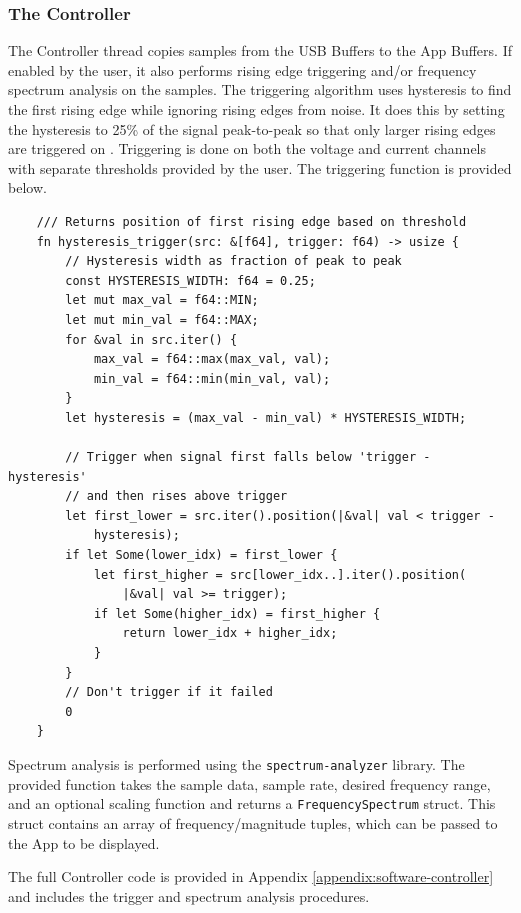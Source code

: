 \documentclass[letterpaper,11pt]{article}
\newcommand{\code}[1]{\texttt{#1}}
\begin{document}
\subsubsection{The Controller} \label{sec:soft-controller}
The Controller thread copies samples from the USB Buffers to the App Buffers.
If enabled by the user, it also performs rising edge triggering and/or frequency
spectrum analysis on the samples. The triggering algorithm uses hysteresis to
find the first rising edge while ignoring rising edges from noise. It does this
by setting the hysteresis to 25\% of the signal peak-to-peak so that only larger
rising edges are triggered on \cite{hysteresis}. Triggering is done on both the
voltage and current channels with separate thresholds provided by the user.
The triggering function is provided below.

\begin{verbatim}
    /// Returns position of first rising edge based on threshold
    fn hysteresis_trigger(src: &[f64], trigger: f64) -> usize {
        // Hysteresis width as fraction of peak to peak
        const HYSTERESIS_WIDTH: f64 = 0.25;
        let mut max_val = f64::MIN;
        let mut min_val = f64::MAX;
        for &val in src.iter() {
            max_val = f64::max(max_val, val);
            min_val = f64::min(min_val, val);
        }
        let hysteresis = (max_val - min_val) * HYSTERESIS_WIDTH;

        // Trigger when signal first falls below 'trigger - hysteresis'
        // and then rises above trigger
        let first_lower = src.iter().position(|&val| val < trigger -
            hysteresis);
        if let Some(lower_idx) = first_lower {
            let first_higher = src[lower_idx..].iter().position(
                |&val| val >= trigger);
            if let Some(higher_idx) = first_higher {
                return lower_idx + higher_idx;
            }
        }
        // Don't trigger if it failed
        0
    }
\end{verbatim}

Spectrum analysis is performed using the \code{spectrum-analyzer} library. The
provided function takes the sample data, sample rate, desired frequency range,
and an optional scaling function and returns a \code{FrequencySpectrum} struct.
This struct contains an array of frequency/magnitude tuples, which can be passed
to the App to be displayed.

The full Controller code is provided in Appendix \ref{appendix:software-controller}
and includes the trigger and spectrum analysis procedures.
\end{document}
